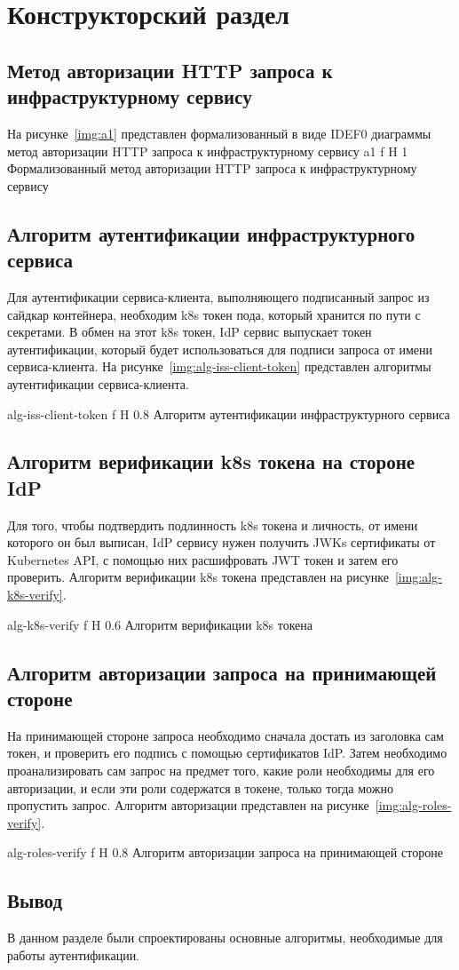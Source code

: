 \chapter{Конструкторский раздел}

\section{Метод авторизации HTTP запроса к инфраструктурному сервису}
На рисунке~\ref{img:a1} представлен формализованный в виде IDEF0 диаграммы метод авторизации HTTP запроса к инфраструктурному сервису
    {a1}
    {f}
    {H}
    {1\textwidth}
    {Формализованный метод авторизации HTTP запроса к инфраструктурному сервису}


\section{Алгоритм аутентификации инфраструктурного сервиса}
Для аутентификации сервиса-клиента, выполняющего подписанный запрос из сайдкар контейнера, необходим k8s токен пода, который хранится по пути с секретами. В обмен на этот k8s токен, IdP сервис выпускает токен аутентификации, который будет использоваться для подписи запроса от имени сервиса-клиента. На рисунке~\ref{img:alg-iss-client-token} представлен алгоритмы аутентификации сервиса-клиента.

    {alg-iss-client-token}
    {f}
    {H}
    {0.8\textwidth}
    {Алгоритм аутентификации инфраструктурного сервиса}


\section{Алгоритм верификации k8s токена на стороне IdP}
Для того, чтобы подтвердить подлинность k8s токена и личность, от имени которого он был выписан, IdP сервису нужен получить JWKs сертификаты от Kubernetes API, с помощью них расшифровать JWT токен и затем его проверить. Алгоритм верификации k8s токена представлен на рисунке~\ref{img:alg-k8s-verify}.

    {alg-k8s-verify}
    {f}
    {H}
    {0.6\textwidth}
    {Алгоритм верификации k8s токена}
    

\section{Алгоритм авторизации запроса на принимающей стороне}
На принимающей стороне запроса необходимо сначала достать из заголовка сам токен, и проверить его подпись с помощью сертификатов IdP. Затем необходимо проанализировать сам запрос на предмет того, какие роли необходимы для его авторизации, и если эти роли содержатся в токене, только тогда можно пропустить запрос. Алгоритм авторизации представлен на рисунке~\ref{img:alg-roles-verify}.

    {alg-roles-verify}
    {f}
    {H}
    {0.8\textwidth}
    {Алгоритм авторизации запроса на принимающей стороне}


\section*{Вывод}
В данном разделе были спроектированы основные алгоритмы, необходимые для работы аутентификации.